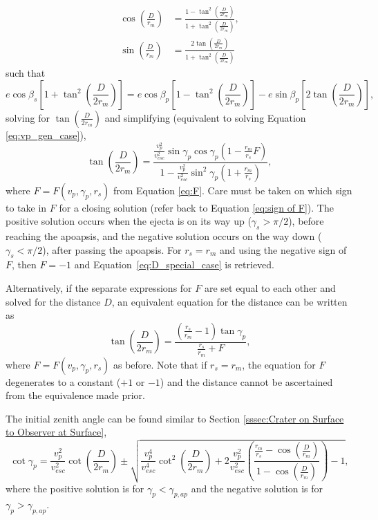 \documentclass{article}
\begin{document}
\begin{align}
\cos\left(\frac{D}{r_m}\right) &= \frac{1-\tan^2\left(\frac{D}{2r_m}\right)}{1+\tan^2\left(\frac{D}{2r_m}\right)},\\
\sin\left(\frac{D}{r_m}\right) &= \frac{2\tan\left(\frac{D}{2r_m}\right)}{1+\tan^2\left(\frac{D}{2r_m}\right)}
\end{align}
such that
\begin{equation}
e\cos\beta_s\left[1+\tan^2\left(\frac{D}{2r_m}\right)\right] = e\cos\beta_p\left[1-\tan^2\left(\frac{D}{2r_m}\right)\right] - e\sin\beta_p\left[2\tan\left(\frac{D}{2r_m}\right)\right],
\end{equation}
solving for $\tan\left(\frac{D}{2r_m}\right)$ and simplifying (equivalent to solving Equation \eqref{eq:vp_gen_case}),
\begin{equation}\label{eq:D_general_case}
\tan\left(\frac{D}{2r_m}\right) = \frac{\frac{v_p^2}{v_{esc}^2}\sin\gamma_p\cos\gamma_p\left(1-\frac{r_m}{r_s}F\right)}{1-\frac{v_p^2}{v_{esc}^2}\sin^2\gamma_p\left(1+\frac{r_m}{r_s}\right)},
\end{equation}
where $F = F(v_p,\gamma_p,r_s)$ from Equation \eqref{eq:F}. Care must be taken on which sign to take in $F$ for a closing solution (refer back to Equation \eqref{eq:sign of F}). The positive solution occurs when the ejecta is on its way up ($\gamma_s > \pi/2$), before reaching the apoapsis, and the negative solution occurs on the way down ($\gamma_s < \pi/2$), after passing the apoapsis. For $r_s=r_m$ and using the negative sign of $F$, then $F=-1$ and Equation~\eqref{eq:D_special_case} is retrieved.


Alternatively, if the separate expressions for $F$ are set equal to each other and solved for the distance $D$, an equivalent equation for the distance can be written as
\begin{equation}
\tan\left(\frac{D}{2r_m}\right) = \frac{\left(\frac{r_s}{r_m}-1\right)\tan\gamma_p}{\frac{r_s}{r_m}+ F},
\end{equation}
where $F = F(v_p,\gamma_p,r_s)$ as before. Note that if $r_s = r_m$, the equation for $F$ degenerates to a constant ($+1$ or $-1$) and the distance cannot be ascertained from the equivalence made prior.



The initial zenith angle can be found similar to Section \ref{sssec:Crater on Surface to Observer at Surface},
\begin{equation}
\label{eq:generalcase gammap}
\cot\gamma_p = \frac{v_p^2}{v_{esc}^2}\cot\left(\frac{D}{2r_m}\right) \pm \sqrt{\frac{v_p^4}{v_{esc}^4}\cot^2\left(\frac{D}{2r_m}\right) + 2\frac{v_p^2}{v_{esc}^2}\left(\frac{\frac{r_m}{r_s}-\cos\left(\frac{D}{r_m}\right)}{1-\cos\left(\frac{D}{r_m}\right)}\right)-1},
\end{equation}
where the positive solution is for $\gamma_p < \gamma_{p,ap}$ and the negative solution is for $\gamma_p > \gamma_{p,ap}$.
\end{document}
